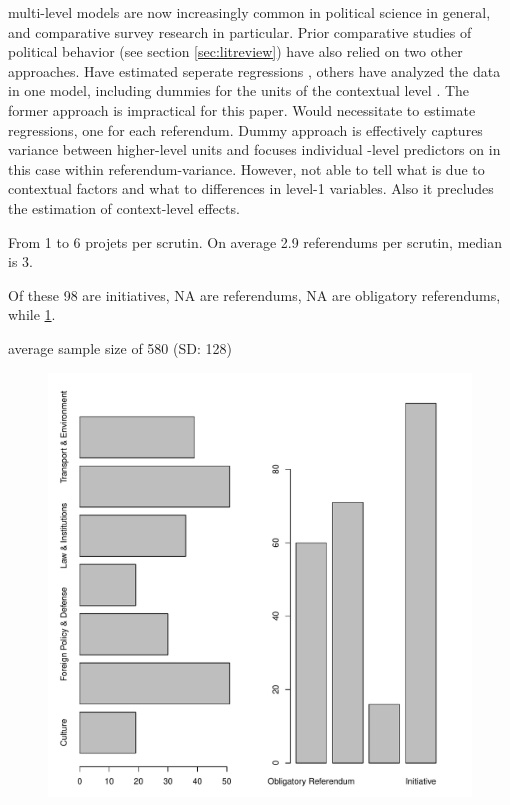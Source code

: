 \documentclass[11pt,a4paper]{article}\usepackage[]{graphicx}\usepackage[]{color}
\makeatletter
\def\maxwidth{ %
  \ifdim\Gin@nat@width>\linewidth
    \linewidth
  \else
    \Gin@nat@width
  \fi
}
\newenvironment{knitrout}{}{} %
\makeatother
\begin{document}
multi-level models are now increasingly common in political science in general, and comparative survey research in particular. Prior comparative studies of political behavior (see section \ref{sec:litreview}) have also relied on two other approaches. Have estimated seperate regressions %
, others have analyzed the data in one model, including dummies for the units of the contextual level 
\citep{eichenberg_europeans_1993}. The former approach is impractical for this paper. Would necessitate to estimate %
regressions, one for each referendum. Dummy approach is effectively captures variance between higher-level units and focuses individual -level predictors on in this case within referendum-variance. However, not able to tell what is due to contextual factors and what to differences in level-1 variables. Also it precludes the estimation of context-level effects. 

From 1 to 6 projets per scrutin. On average 2.9 referendums per scrutin, median is 3.

Of these 98 are initiatives, NA are referendums, %
NA are obligatory referendums, while %
\ref{fig:typetopic}.



average sample size of 580 (SD: 128)

\begin{figure}
\begin{knitrout}
\color{fgcolor}
\includegraphics[width=\maxwidth]{figure/unnamed-chunk-2-1} 

\end{knitrout}
\caption{}\label{fig:typetopic}
\end{figure}
\end{document}
